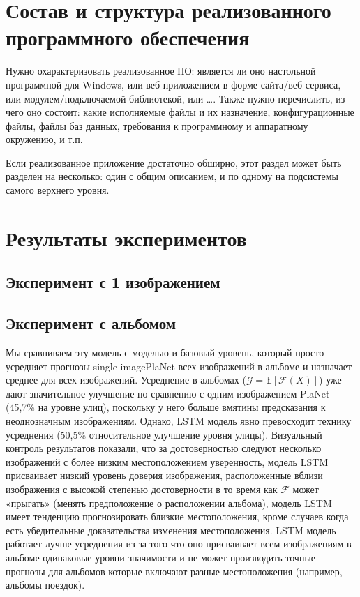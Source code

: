 \section{Состав и структура реализованного программного обеспечения}

Нужно охарактеризовать реализованное ПО: является ли оно настольной программной для Windows, или веб-приложением в форме сайта/веб-сервиса, или модулем/подключаемой библиотекой, или \dots. Также нужно перечислить, из чего оно состоит: какие исполняемые файлы и их назначение, конфигурационные файлы, файлы баз данных, требования к программному и аппаратному окружению, и т.п.

Если реализованное приложение достаточно обширно, этот раздел может быть
разделен на несколько: один с общим описанием, и по одному на подсистемы самого
верхнего уровня.
\section{Результаты экспериментов}

\subsection{Эксперимент с 1 изображением}


\subsection{Эксперимент с альбомом} Мы сравниваем эту модель с моделью и базовый уровень, который просто усредняет прогнозы single-imagePlaNet всех изображений в альбоме и назначает
среднее для всех изображений. Усреднение в альбомах ($ \mathcal{G}= \mathbb{E}[ \mathcal{F}(X) ] $) уже
дают значительное улучшение по сравнению с одним изображением PlaNet
(45,7\% на уровне улиц), поскольку у него больше
вмятины предсказания к неоднозначным изображениям. Однако, LSTM
модель явно превосходит технику усреднения (50,5\%
относительное улучшение уровня улицы). Визуальный контроль
результатов показали, что за достоверностью следуют несколько изображений с более низким местоположением уверенность, модель LSTM присваивает низкий уровень доверия изображения, расположенные вблизи изображения с высокой степенью достоверности в то время как $ \mathcal{F} $ может «прыгать» (менять предположение о расположении альбома), модель LSTM имеет тенденцию прогнозировать близкие местоположения, кроме случаев когда есть убедительные доказательства изменения местоположения. LSTM модель работает лучше усреднения из-за того что оно присваивает всем изображениям в альбоме одинаковые уровни значимости и не может производить точные прогнозы для альбомов которые включают разные местоположения (например, альбомы поездок).

